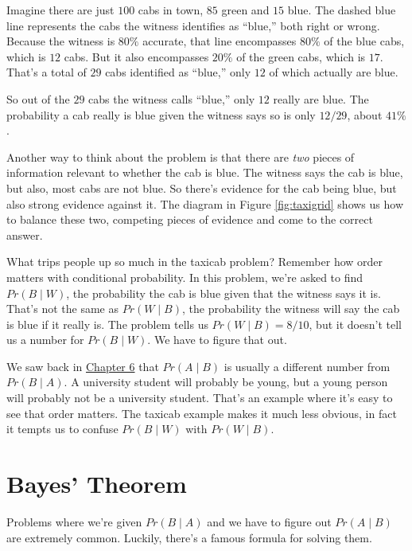 \documentclass[justified]{tufte-book}
\newcommand{\given}{\mid}
\newcommand{\p}{Pr}
\theoremstyle{definition}
\theoremstyle{definition}
\theoremstyle{definition}
\theoremstyle{definition}
\theoremstyle{remark}
\begin{document}
Imagine there are just \(100\) cabs in town, \(85\) green and \(15\) blue. The dashed blue line represents the cabs the witness identifies as
``blue,'' both right or wrong. Because the witness is \(80\%\) accurate, that line encompasses \(80\%\) of the blue cabs, which is \(12\) cabs. But it also encompasses \(20\%\) of the green cabs, which is \(17\). That's a total of \(29\) cabs identified as ``blue,'' only \(12\) of which actually are blue.

So out of the \(29\) cabs the witness calls ``blue,'' only \(12\) really are blue. The probability a cab really is blue given the witness says so is only \(12/29\), about \(41\%\).

Another way to think about the problem is that there are \emph{two} pieces of information relevant to whether the cab is blue. The witness says the cab is blue, but also, most cabs are not blue. So there's evidence for the cab being blue, but also strong evidence against it. The diagram in Figure \ref{fig:taxigrid} shows us how to balance these two, competing pieces of evidence and come to the correct answer.

What trips people up so much in the taxicab problem? Remember how order matters with conditional probability. In this problem, we're asked to find \(\p(B \given W)\), the probability the cab is blue given that the witness says it is. That's not the same as \(\p(W \given B)\), the probability the witness will say the cab is blue if it really is. The problem tells us \(\p(W \given B) = 8/10\), but it doesn't tell us a number for \(\p(B \given W)\). We have to figure that out.

We saw back in \protect\hyperlink{conditional-probability}{Chapter 6} that \(\p(A \given B)\) is usually a different number from \(\p(B \given A)\). A university student will probably be young, but a young person will probably not be a university student. That's an example where it's easy to see that order matters. The taxicab example makes it much less obvious, in fact it tempts us to confuse \(\p(B \given W)\) with \(\p(W \given B)\).

\hypertarget{bayes-theorem}{%
\section{Bayes' Theorem}\label{bayes-theorem}}

Problems where we're given \(\p(B \given A)\) and we have to figure out \(\p(A \given B)\) are extremely common. Luckily, there's a famous formula for solving them.
\end{document}
